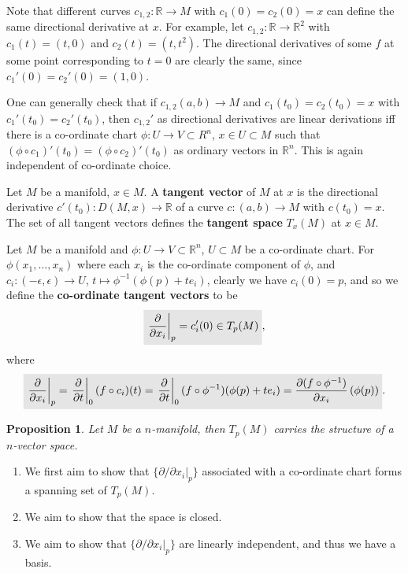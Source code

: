 \documentclass[letter-paper]{tufte-book}
\newtheorem{proposition}[theorem]{\color{pastel-blue}Proposition}
\newenvironment{proof}[1][Proof]{\begin{trivlist}
\item[\hskip \labelsep {\bfseries #1}]}{\end{trivlist}}
\newenvironment{example}[1][Example]{\begin{trivlist}
\item[\hskip \labelsep {\bfseries #1}]}{\end{trivlist}}
\newcommand{\highlight}[1]{\mathchoice%
  {\colorbox{black!10}{$\displaystyle#1$}}%
  {\colorbox{black!10}{$\textstyle#1$}}%
  {\colorbox{black!10}{$\scriptstyle#1$}}%
  {\colorbox{black!10}{$\scriptscriptstyle#1$}}}%
\begin{document}
\begin{example}
  Note that different curves $c_{1,2}:\mathbb{R}\to M$ with $c_1(0) = c_2(0) = x$ can define the same directional derivative at $x$. For example, let $c_{1,2} :\mathbb{R} \to \mathbb{R}^2$ with $c_1(t) = (t,0)$ and $c_2(t) = (t, t^2)$. The directional derivatives of some $f$ at some point corresponding to $t=0$ are clearly the same, since $c_1'(0) = c_2'(0) = (1,0)$.
\end{example}

One can generally check that if $c_{1,2}(a,b) \to M$ and $c_1(t_0) = c_2(t_0) = x$ with $c_1'(t_0) = c_2'(t_0)$, then $c_{1,2}'$ as directional derivatives are linear derivations iff there is a co-ordinate chart $\phi:U\to V\subset{R}^n$, $x\in U\subset M$ such that $(\phi\circ c_1)'(t_0) = (\phi\circ c_2)'(t_0)$ as ordinary vectors in $\mathbb{R}^n$. This is again independent of co-ordinate choice.

Let $M$ be a manifold, $x\in M$. A \textbf{tangent vector} of $M$ at $x$ is the directional derivative $c'(t_0):D(M, x) \to \mathbb{R}$ of a curve $c:(a,b)\to M$ with $c(t_0) = x$. The set of all tangent vectors defines the \textbf{tangent space} $T_x(M)$ at $x\in M$.

Let $M$ be a manifold and $\phi : U \to V \subset \mathbb{R}^n$, $U \subset M$ be a co-ordinate chart. For $\phi(x_1, \ldots, x_n)$ where each $x_i$ is the co-ordinate component of $\phi$, and $c_i:(-\epsilon, \epsilon) \to U$, $t\mapsto \phi^{-1}\left(\phi(p) + te_i\right)$, clearly we have $c_i(0) = p$, and so we define the \textbf{co-ordinate tangent vectors} to be
\begin{equation}
  \highlight{\left.\frac{\partial}{\partial x_i}\right|_p = c_i'(0) \in T_p(M)},
\end{equation}
where
\begin{equation}
  \highlight{\left.\frac{\partial}{\partial x_i}\right|_p = \left.\frac{\partial}{\partial t}\right|_0 (f\circ c_i)(t) = \left.\frac{\partial}{\partial t}\right|_0 (f\circ \phi^{-1})(\phi(p) + te_i) = \frac{\partial(f\circ \phi^{-1})}{\partial x_i}\left(\phi(p)\right)}.
\end{equation}

\begin{proposition}
  Let $M$ be a $n$-manifold, then $T_p(M)$ carries the structure of a $n$-vector space.
\end{proposition}

\begin{proof}
  \begin{enumerate}
    \item We first aim to show that $\{\left.\partial / \partial x_i\right|_p\}$ associated with a co-ordinate chart forms a spanning set of $T_p(M)$.
    
    \item We aim to show that the space is closed.
    
    \item We aim to show that $\{\left.\partial / \partial x_i\right|_p\}$ are linearly independent, and thus we have a basis.
  \end{enumerate}
\end{proof}
\end{document}

